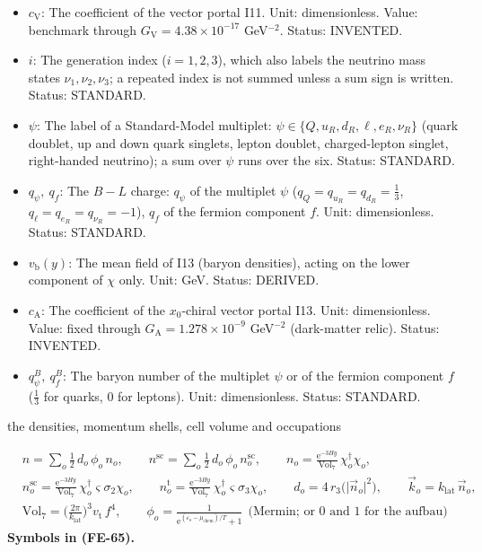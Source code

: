 \documentclass[
  10pt,
]{article}
\begin{document}
\begin{itemize}
  density of the Standard-Model fermion \(\psi_i\) (per proper 7-volume
  of eight dimensions); \(n_f\) the density of the fermion component
  \(f\) and \(n_i\) that of the neutrino mass state \(i\) (per 3-volume
  of four dimensions). Unit: \(\mathrm{GeV}^{7}\) (eight dimensions),
  \(\mathrm{GeV}^{3}\) (four dimensions). Status: STANDARD.
\item
  \(c_{\mathrm{V}}\): The coefficient of the vector portal I11. Unit:
  dimensionless. Value: benchmark through
  \(G_{\mathrm{V}} = 4.38\times10^{-17}\) GeV\(^{-2}\). Status:
  INVENTED.
\item
  \(i\): The generation index (\(i = 1, 2, 3\)), which also labels the
  neutrino mass states \(\nu_1, \nu_2, \nu_3\); a repeated index is not
  summed unless a sum sign is written. Status: STANDARD.
\item
  \(\psi\): The label of a Standard-Model multiplet:
  \(\psi \in \{Q, u_R, d_R, \ell, e_R, \nu_R\}\) (quark doublet, up and
  down quark singlets, lepton doublet, charged-lepton singlet,
  right-handed neutrino); a sum over \(\psi\) runs over the six. Status:
  STANDARD.
\item
  \(q_\psi,\ q_f\): The \(B - L\) charge: \(q_\psi\) of the multiplet
  \(\psi\) (\(q_Q = q_{u_R} = q_{d_R} = \frac13\),
  \(q_\ell = q_{e_R} = q_{\nu_R} = -1\)), \(q_f\) of the fermion
  component \(f\). Unit: dimensionless. Status: STANDARD.
\item
  \(v_{\mathrm{b}}(y)\): The mean field of I13 (baryon densities),
  acting on the lower component of \(\chi\) only. Unit: GeV. Status:
  DERIVED.
\item
  \(c_{\mathrm{A}}\): The coefficient of the \(x_0\)-chiral vector
  portal I13. Unit: dimensionless. Value: fixed through
  \(G_{\mathrm{A}} = 1.278\times10^{-9}\) GeV\(^{-2}\) (dark-matter
  relic). Status: INVENTED.
\item
  \(q^B_\psi,\ q^B_f\): The baryon number of the multiplet \(\psi\) or
  of the fermion component \(f\) (\(\frac13\) for quarks, 0 for
  leptons). Unit: dimensionless. Status: STANDARD.
\end{itemize}

the densities, momentum shells, cell volume and occupations

\[
\begin{aligned}
&n = \sum_o\tfrac12\,d_o\,\phi_o\,n_o,\qquad n^{\mathrm{sc}} =
 \sum_o\tfrac12\,d_o\,\phi_o\,n^{\mathrm{sc}}_o,\qquad
 n_o = \frac{\mathrm{e}^{-3Hy}}{\mathrm{Vol}_7}\,\chi_o^\dagger\chi_o,\\
&n^{\mathrm{sc}}_o = \frac{\mathrm{e}^{-3Hy}}{\mathrm{Vol}_7}\,\chi_o^\dagger\varsigma\sigma_2\chi_o,\qquad
 n^{\mathrm{t}}_o = \frac{\mathrm{e}^{-3Hy}}{\mathrm{Vol}_7}\,\chi_o^\dagger\varsigma\sigma_3\chi_o,\qquad
 d_o = 4\,r_3\big(\lvert\vec n_o\rvert^2\big),\qquad \vec k_o = k_{\mathrm{lat}}\,\vec n_o,\\
&\mathrm{Vol}_7 = \Big(\frac{2\pi}{k_{\mathrm{lat}}}\Big)^3v_{\mathrm{t}}\,f^4,\qquad
 \phi_o = \frac{1}{\mathrm{e}^{(\varepsilon_o - \mu_{\mathrm{chem}})/T} + 1}\ \ \text{(Mermin; or 0 and
 1 for the aufbau)}
\end{aligned} \tag{FE-65}
\] \textbf{Symbols in (FE-65).}
\end{document}
